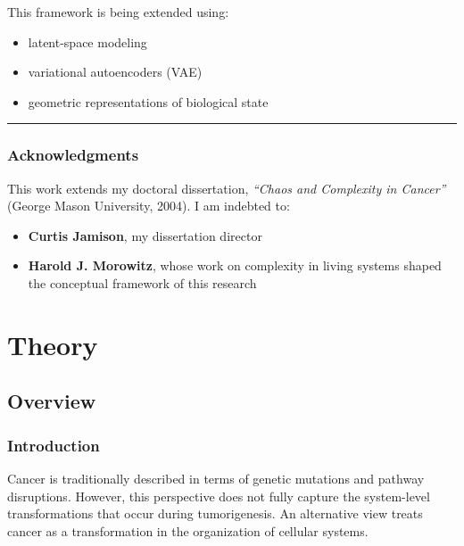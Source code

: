 \documentclass[
  letterpaper,
  DIV=11,
  numbers=noendperiod,
  openany,
  oneside]{scrreprt}
\providecommand{\tightlist}{%
  \setlength{\itemsep}{0pt}\setlength{\parskip}{0pt}}
\begin{document}
This framework is being extended using:

\begin{itemize}
\tightlist
\item
  latent-space modeling\\
\item
  variational autoencoders (VAE)\\
\item
  geometric representations of biological state
\end{itemize}

\begin{center}\rule{0.5\linewidth}{0.5pt}\end{center}

\section{Acknowledgments}\label{acknowledgments}

This work extends my doctoral dissertation, \emph{``Chaos and Complexity
in Cancer''} (George Mason University, 2004). I am indebted to:

\begin{itemize}
\tightlist
\item
  \textbf{Curtis Jamison}, my dissertation director
\item
  \textbf{Harold J. Morowitz}, whose work on complexity in living
  systems shaped the conceptual framework of this research
\end{itemize}

\part{Theory}

\chapter{Overview}\label{overview-1}

\section{Introduction}\label{introduction}

Cancer is traditionally described in terms of genetic mutations and
pathway disruptions. However, this perspective does not fully capture
the system-level transformations that occur during tumorigenesis. An
alternative view treats cancer as a transformation in the organization
of cellular systems.
\end{document}
